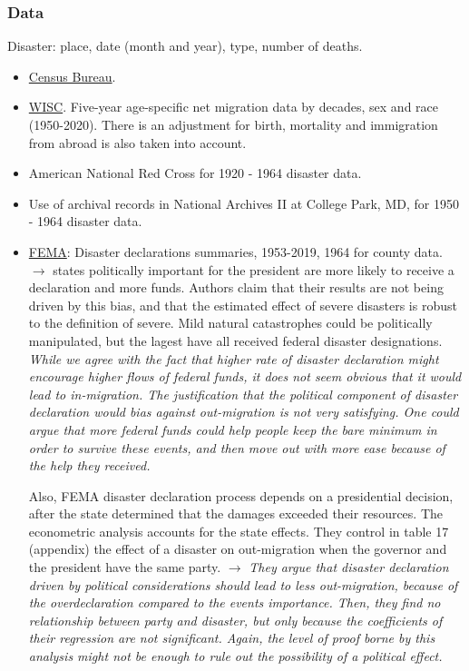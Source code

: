 \documentclass[11pt, oneside]{article}   	%
\begin{document}
\subsubsection{Data}
Disaster: place, date (month and year), type, number of deaths.
\begin{itemize}
    \item \href{https://www.census.gov/data.html}{Census Bureau}.
    \item \href{https://netmigration.wisc.edu/}{WISC}. Five-year age-specific net migration data by decades, sex and race (1950-2020). There is an adjustment for birth, mortality and immigration from abroad is also taken into account. 
    \item American National Red Cross for 1920 - 1964 disaster data.
    \item Use of archival records in National Archives II at College Park, MD, for 1950 - 1964 disaster data.
    \item \href{https://www.fema.gov/openfema-data-page/disaster-declarations-summaries-v2}{FEMA}: Disaster declarations summaries, 1953-2019, 1964 for county data. $\to$ states politically important for the president are more likely to receive a declaration and more funds. Authors claim that their results are not being driven by this bias, and that the estimated effect of severe disasters is robust to the definition of severe. Mild natural catastrophes could be politically manipulated, but the lagest have all received federal disaster designations. \textit{While we agree with the fact that higher rate of disaster declaration might encourage higher flows of federal funds, it does not seem obvious that it would lead to in-migration. The justification that the political component of disaster declaration would bias against out-migration is not very satisfying. One could argue that more federal funds could help people keep the bare minimum in order to survive these events, and then move out with more ease because of the help they received.}

    Also, FEMA disaster declaration process depends on a presidential decision, after the state determined that the damages exceeded their resources. The econometric analysis accounts for the state effects. They control in table 17 (appendix) the effect of a disaster on out-migration when the governor and the president have the same party. $\to$ \textit{They argue that disaster declaration driven by political considerations should lead to less out-migration, because of the overdeclaration compared to the events importance. Then, they find no relationship between party and disaster, but only because the coefficients of their regression are not significant. Again, the level of proof borne by this analysis might not be enough to rule out the possibility of a political effect.}
    

\end{itemize}
\end{document}
